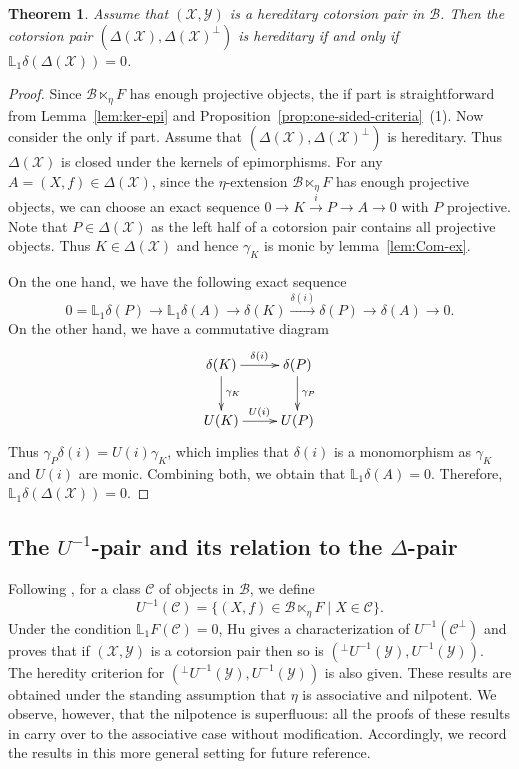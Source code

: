 \documentclass[11pt,reqno]{amsart}
\numberwithin{equation}{section}
\newtheorem{theorem}{Theorem}[section]
\newcommand{\cB}{\mathcal B}
\newcommand{\cX}{\mathcal X}
\newcommand{\cY}{\mathcal Y}
\newcommand{\cC}{\mathcal C}
\begin{document}
\begin{theorem}\label{thm:Delta-heredity}
Assume that $(\cX,\cY)$ is a hereditary cotorsion pair in $\cB$. Then the cotorsion pair $(\Delta(\cX),\Delta(\cX)^\perp)$ is hereditary if
and only if $\mathbb{L}_1\delta(\Delta(\cX))=0$.
\end{theorem}
\begin{proof}
Since $\cB\ltimes_\eta F$ has enough projective objects,
the if part is straightforward from Lemma~\ref{lem:ker-epi} and Proposition~\ref{prop:one-sided-criteria}~(1). Now consider the only if part. Assume that $(\Delta(\cX),\Delta(\cX)^\perp)$ is hereditary.
Thus $\Delta(\cX)$ is closed under the kernels of epimorphisms. For any $A=(X,f)\in \Delta(\cX)$,
since the $\eta$-extension $\cB\ltimes_\eta F$ has enough projective objects,
we can choose an exact sequence $0\rightarrow K\xrightarrow{i} P\rightarrow A\rightarrow 0$ with $P$ projective.
Note that $P\in \Delta(\cX)$ as the left half of a cotorsion pair contains all projective objects. Thus $K\in \Delta(\cX)$ and hence $\gamma_K$ is monic by lemma~\ref{lem:Com-ex}.

On the one hand, we have the following exact sequence
\[
0=\mathbb{L}_1\delta(P) \rightarrow \mathbb{L}_1\delta(A) \rightarrow \delta(K)\xrightarrow{\delta(i)} \delta(P) \rightarrow \delta(A) \rightarrow 0.
\]
On the other hand, we have a commutative diagram
\[
\xymatrix{
\delta(K)\ar[d]^{\gamma_K}\ar[r]^{\delta(i)} & \delta(P) \ar[d]^{\gamma_P}\\
U(K) \ar[r]^{U(i)} & U(P)
}
\]
Thus $\gamma_P\delta(i)=U(i)\gamma_K$, which implies that $\delta(i)$ is a monomorphism as $\gamma_K$ and $U(i)$ are monic. Combining both, we obtain that $\mathbb{L}_1\delta(A)=0$.
Therefore, $\mathbb{L}_1\delta(\Delta(\cX))=0$.
\end{proof}

\subsection{The \texorpdfstring{$U^{-1}$}{U-inverse}-pair and its relation to the \texorpdfstring{$\Delta$}{Delta}-pair} Following \cite{Hu}, for a class $\cC$ of objects in $\cB$, we define
\[
U^{-1}(\cC)=\{(X,f)\in \cB\ltimes_\eta F\mid X\in \cC\}.
\]
Under the condition $\mathbb{L}_1F(\cC)=0$, Hu \cite{Hu} gives a characterization of $U^{-1}(\cC^\perp)$ and proves that if $(\cX,\cY)$ is a cotorsion pair then
so is $({}^\perp U^{-1}(\cY),U^{-1}(\cY))$. The heredity criterion for $({}^\perp U^{-1}(\cY),U^{-1}(\cY))$ is also given. These results are obtained under the standing assumption that $\eta$ is associative and nilpotent. We observe, however, that the nilpotence is superfluous: all the proofs of these results in \cite{Hu} carry over to the associative case without modification. Accordingly, we record the results in this more general setting for future reference.
\end{document}
